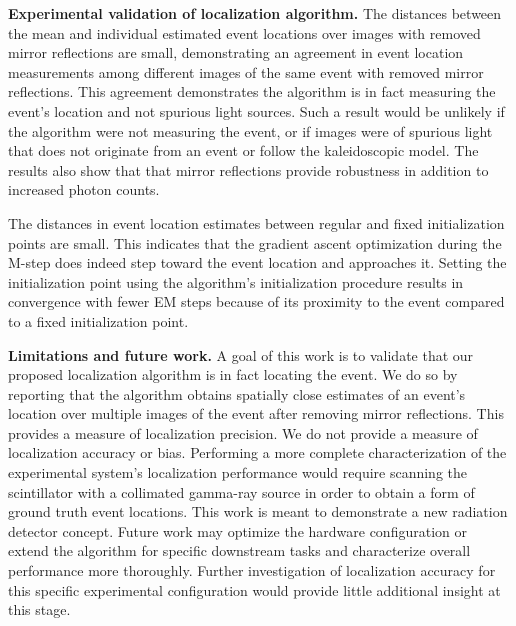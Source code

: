 \noindent
\textbf{Experimental validation of localization algorithm.}
The distances between the mean and individual estimated event locations over 
images with removed mirror reflections are small, demonstrating an agreement in 
event location measurements among different images of the same event with removed 
mirror reflections.
This agreement demonstrates the algorithm is in fact measuring the event's 
location and not spurious light sources.
Such a result would be unlikely if the algorithm were not measuring the event, or 
if images were of spurious light that does not originate from an event or follow 
the kaleidoscopic model.
The results also show that that mirror reflections provide robustness in 
addition to increased photon counts.

The distances in event location estimates between regular and fixed 
initialization points are small.
This indicates that the gradient ascent optimization during the M-step does indeed 
step toward the event location and approaches it.
Setting the initialization point using the algorithm's initialization procedure 
results in convergence with fewer EM steps because of its proximity to the event 
compared to a fixed initialization point. 

\noindent
\textbf{Limitations and future work.}
A goal of this work is to validate that our proposed localization algorithm is in 
fact locating the event.
We do so by reporting that the algorithm obtains spatially close estimates of an 
event's location over multiple images of the event after removing mirror reflections.
This provides a measure of localization precision.
We do not provide a measure of localization accuracy or bias.
Performing a more complete characterization of the experimental system's 
localization performance would require scanning the scintillator with a collimated 
gamma-ray source in order to obtain a form of ground truth event locations.
This work is meant to demonstrate a new radiation detector concept.
Future work may optimize the hardware configuration or extend the algorithm for 
specific downstream tasks and characterize overall performance more thoroughly.
Further investigation of localization accuracy for this specific experimental 
configuration would provide little additional insight at this stage.

